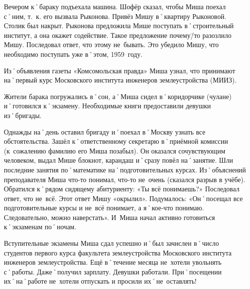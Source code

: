Вечером к˚бараку подъехала машина. Шофёр сказал, чтобы Миша поехал с˚ним, т.~к. его вызвала Рыконова. Привёз Мишу в˚квартиру Рыконовой. Столик был накрыт. Рыконова предложила Мише поступать в˚строительный институт, а она окажет содействие. Такое предложение почему\=/то разозлило Мишу. Последовал ответ, что этому не~бывать. Это убедило Мишу, что необходимо поступать уже в˚этом, 1959~году.

Из˚объявления газеты «Комсомольская правда» Миша узнал, что принимают на˚первый курс Московского института инженеров землеустройства (МИИЗ).

Жители барака погружались в˚сон, а˚Миша сидел в˚коридорчике (чулане)  и˚готовился к˚экзамену. Необходимые книги предоставили девушки из˚бригады.

Однажды на˚день оставил бригаду и˚поехал в˚Москву узнать  все обстоятельства. Зашёл к˚ответственному секретарю в˚приёмной комиссии (к~сожалению фамилию его Миша позабыл). Он оказался сочувствующим человеком, выдал Мише блокнот, карандаш и˚сразу повёл на˚занятие. Шли последние занятия по˚математике на˚подготовительных курсах. Из˚объяснений преподавателя Миша что-то понимал, что-то не~очень (сказался разрыв в учёбе). Обратился к˚рядом сидящему абитуриенту: «Ты всё понимаешь?» Последовал ответ, что не~всё. Этот ответ Мишу «окрылил». Подумалось: «Он˚посещал все подготовительные курсы и не~всё понимает, а я˚кое-что понимаю. Следовательно, можно наверстать». И~Миша начал активно готовиться к˚экзаменам по˚ночам.

Вступительные экзамены Миша сдал успешно и˚был зачислен в˚число студентов первого курса факультета землеустройства Московского института инженеров землеустройства. Ещё в˚течение месяца не~хотели увольнять с˚работы. Даже˚получил зарплату. Девушки работали. При˚посещении их˚на˚работе не~хотели отпускать и просили их˚не~оставлять!